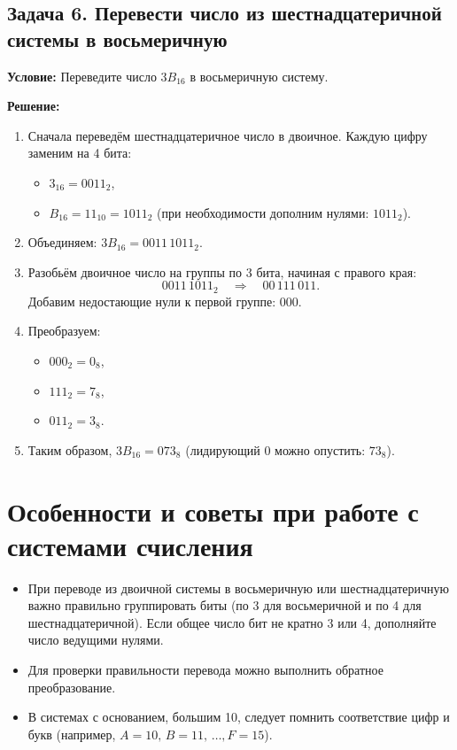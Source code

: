 \documentclass[12pt,a4paper]{article}
\begin{document}
\subsection{Задача 6. Перевести число из шестнадцатеричной системы в восьмеричную}
\textbf{Условие:} Переведите число \(3B_{16}\) в восьмеричную систему.

\textbf{Решение:}
\begin{enumerate}
    \item Сначала переведём шестнадцатеричное число в двоичное. Каждую цифру заменим на 4 бита:
    \begin{itemize}
        \item \(3_{16} = 0011_2\),
        \item \(B_{16} = 11_{10} = 1011_2\) (при необходимости дополним нулями: \(1011_2\)).
    \end{itemize}
    \item Объединяем: \(3B_{16} = 0011\,1011_2\).
    \item Разобьём двоичное число на группы по 3 бита, начиная с правого края:
    \[
    0011\,1011_2 \quad \Rightarrow \quad 00\, 111\, 011.
    \]
    Добавим недостающие нули к первой группе: \(000\).
    \item Преобразуем:
    \begin{itemize}
        \item \(000_2 = 0_8\),
        \item \(111_2 = 7_8\),
        \item \(011_2 = 3_8\).
    \end{itemize}
    \item Таким образом, \(3B_{16} = 073_8\) (лидирующий 0 можно опустить: \(73_8\)).
\end{enumerate}

\section{Особенности и советы при работе с системами счисления}
\begin{itemize}
    \item При переводе из двоичной системы в восьмеричную или шестнадцатеричную важно правильно группировать биты (по 3 для восьмеричной и по 4 для шестнадцатеричной). Если общее число бит не кратно 3 или 4, дополняйте число ведущими нулями.
    \item Для проверки правильности перевода можно выполнить обратное преобразование.
    \item В системах с основанием, большим 10, следует помнить соответствие цифр и букв (например, \(A=10,\, B=11,\, \dots, F=15\)).
\end{itemize}
\end{document}
